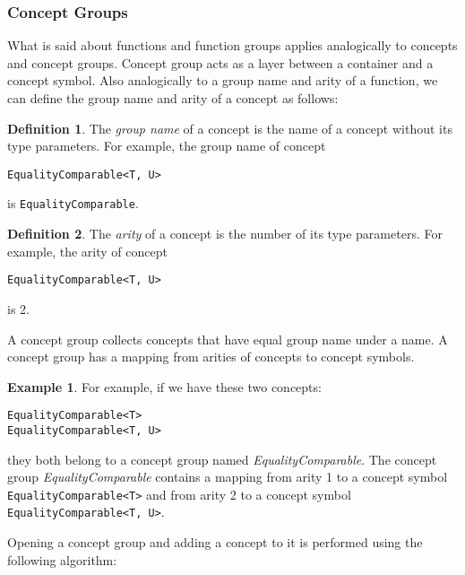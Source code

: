 \documentclass[a4paper,oneside,11pt]{book}
\theoremstyle{definition}
\newtheorem{exmp}{Example}[section]
\newtheorem{defn}{Definition}[section]
\begin{document}
\subsubsection{Concept Groups}

What is said about functions and function groups applies analogically to concepts and concept groups.
Concept group acts as a layer between a container and a concept symbol.
Also analogically to a group name and arity of a function, we can define the group name and arity of
a concept as follows:

\begin{defn} The \emph{group name} of a concept is the name of a concept without its type parameters.
For example, the group name of concept
\begin{verbatim}
EqualityComparable<T, U>
\end{verbatim}
is \verb|EqualityComparable|.
\end{defn}

\begin{defn} The \emph{arity} of a concept is the number of its type parameters.
For example, the arity of concept
\begin{verbatim}
EqualityComparable<T, U>
\end{verbatim}
is 2.
\end{defn}

A concept group collects concepts that have equal group name under a name.
A concept group has a mapping from arities of concepts to concept symbols.

\begin{exmp}
For example, if we have these two concepts:
\begin{verbatim}
EqualityComparable<T>
EqualityComparable<T, U>
\end{verbatim}

they both belong to a concept group named \emph{EqualityComparable}.
The concept group \emph{EqualityComparable} contains a mapping from arity 1 to a concept symbol
\verb|EqualityComparable<T>| and from arity 2 to a concept symbol \verb|EqualityComparable<T, U>|.
\end{exmp}

Opening a concept group and adding a concept to it is performed using the following algorithm:
\end{document}
